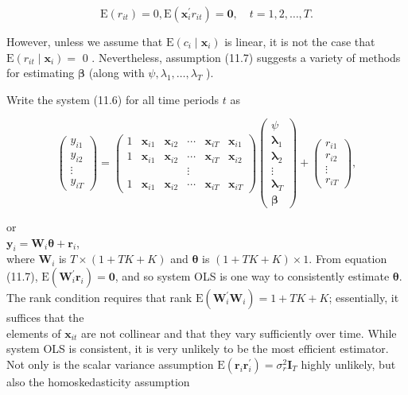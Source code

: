 \documentclass[10pt]{article}
\begin{document}
\begin{equation*}
\mathrm{E}\left(r_{i t}\right)=0, \mathrm{E}\left(\mathbf{x}_{i}^{\prime} r_{i t}\right)=\mathbf{0}, \quad t=1,2, \ldots, T . \tag{11.7}
\end{equation*}


However, unless we assume that $\mathrm{E}\left(c_{i} \mid \mathbf{x}_{i}\right)$ is linear, it is not the case that $\mathrm{E}\left(r_{i t} \mid \mathbf{x}_{i}\right)=$ 0 . Nevertheless, assumption (11.7) suggests a variety of methods for estimating $\boldsymbol{\beta}$ (along with $\psi, \lambda_{1}, \ldots, \lambda_{T}$ ).

Write the system (11.6) for all time periods $t$ as

\[
\left(\begin{array}{c}
y_{i 1}  \tag{11.8}\\
y_{i 2} \\
\vdots \\
y_{i T}
\end{array}\right)=\left(\begin{array}{cccccc}
1 & \mathbf{x}_{i 1} & \mathbf{x}_{i 2} & \cdots & \mathbf{x}_{i T} & \mathbf{x}_{i 1} \\
1 & \mathbf{x}_{i 1} & \mathbf{x}_{i 2} & \cdots & \mathbf{x}_{i T} & \mathbf{x}_{i 2} \\
& & & \vdots & & \\
1 & \mathbf{x}_{i 1} & \mathbf{x}_{i 2} & \cdots & \mathbf{x}_{i T} & \mathbf{x}_{i T}
\end{array}\right)\left(\begin{array}{c}
\psi \\
\boldsymbol{\lambda}_{1} \\
\boldsymbol{\lambda}_{2} \\
\vdots \\
\boldsymbol{\lambda}_{T} \\
\boldsymbol{\beta}
\end{array}\right)+\left(\begin{array}{c}
r_{i 1} \\
r_{i 2} \\
\vdots \\
r_{i T}
\end{array}\right),
\]

or\\
$\mathbf{y}_{i}=\mathbf{W}_{i} \boldsymbol{\theta}+\mathbf{r}_{i}$,\\
where $\mathbf{W}_{i}$ is $T \times(1+T K+K)$ and $\boldsymbol{\theta}$ is $(1+T K+K) \times 1$. From equation (11.7), $\mathrm{E}\left(\mathbf{W}_{i}^{\prime} \mathbf{r}_{i}\right)=\mathbf{0}$, and so system OLS is one way to consistently estimate $\boldsymbol{\theta}$. The rank condition requires that rank $\mathrm{E}\left(\mathbf{W}_{i}^{\prime} \mathbf{W}_{i}\right)=1+T K+K$; essentially, it suffices that the\\
elements of $\mathbf{x}_{i t}$ are not collinear and that they vary sufficiently over time. While system OLS is consistent, it is very unlikely to be the most efficient estimator. Not only is the scalar variance assumption $\mathrm{E}\left(\mathbf{r}_{i} \mathbf{r}_{i}^{\prime}\right)=\sigma_{r}^{2} \mathbf{I}_{T}$ highly unlikely, but also the homoskedasticity assumption
\end{document}
